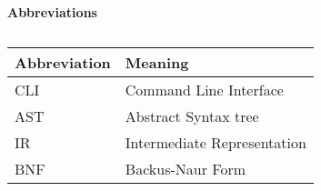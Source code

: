 \textbf{Abbreviations}\\
\begin{table}[H]
  \caption{}
  \label{tab:}
  \begin{tabular}{|p{5cm}|p{5cm}|}
    \hline
    Abbreviation & Meaning\\
    \hline
    CLI & Command Line Interface\\
    \hline
    AST & Abstract Syntax tree\\
    \hline
    IR & Intermediate Representation\\
    \hline
    BNF & Backus-Naur Form \\
    \hline
  \end{tabular}
\end{table}

\newpage

